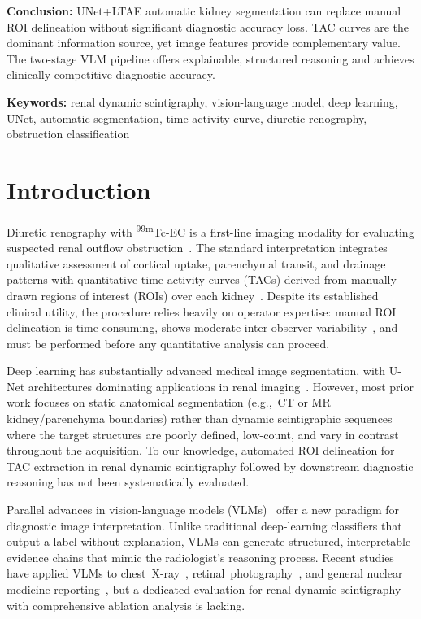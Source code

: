 \documentclass[sn-basic]{sn-jnl}
\begin{document}
\textbf{Conclusion:}
UNet+LTAE automatic kidney segmentation can replace manual
ROI delineation without significant diagnostic accuracy
loss.  TAC curves are the dominant information source, yet
image features provide complementary value.  The two-stage
VLM pipeline offers explainable, structured reasoning and
achieves clinically competitive diagnostic accuracy.

\vspace{1em}
\noindent\textbf{Keywords:}
renal dynamic scintigraphy, vision-language model, deep
learning, UNet, automatic segmentation, time-activity curve,
diuretic renography, obstruction classification

\section{Introduction}
\label{sec:intro}

Diuretic renography with \textsuperscript{99m}Tc-EC is a
first-line imaging modality for evaluating suspected renal
outflow obstruction~\cite{oneill,rossleigh}.  The standard
interpretation integrates qualitative assessment of cortical
uptake, parenchymal transit, and drainage patterns with
quantitative time-activity curves (TACs) derived from
manually drawn regions of interest (ROIs) over each
kidney~\cite{gordon,taylor}.  Despite its established
clinical utility, the procedure relies heavily on operator
expertise: manual ROI delineation is time-consuming, shows
moderate inter-observer variability~\cite{degaard}, and must
be performed before any quantitative analysis can proceed.

Deep learning has substantially advanced medical image
segmentation, with U-Net architectures dominating
applications in renal imaging~\cite{ronneberger,
isensee}.  However, most prior work focuses on static
anatomical segmentation (e.g.,~CT or MR
kidney/parenchyma boundaries) rather than dynamic
scintigraphic sequences where the target structures are
poorly defined, low-count, and vary in contrast throughout
the acquisition.  To our knowledge, automated ROI
delineation for TAC extraction in renal dynamic scintigraphy
followed by downstream diagnostic reasoning has not been
systematically evaluated.

Parallel advances in vision-language models
(VLMs)~\cite{openai,gpt4} offer a new paradigm for
diagnostic image interpretation.  Unlike traditional
deep-learning classifiers that output a label without
explanation, VLMs can generate structured, interpretable
evidence chains that mimic the radiologist's reasoning
process.  Recent studies have applied VLMs to
chest~X-ray~\cite{wu}, retinal~photography~\cite{luo}, and
general nuclear medicine
reporting~\cite{sibille,werner}, but a dedicated evaluation
for renal dynamic scintigraphy with comprehensive ablation
analysis is lacking.
\end{document}
